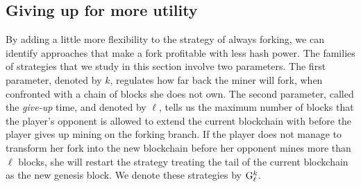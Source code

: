 %

\subsection{Giving up for more utility}
\label{sec-giving-up}


By adding a little more flexibility to the strategy of always forking, we can identify approaches that make a fork profitable with less hash power. The families of strategies that we study in this section involve two parameters. The first parameter, denoted by $k$, regulates how far back the miner will fork, when confronted with a chain of blocks she does not own. The second parameter, called the \textit{give-up} time, and denoted by $\ell$, tells us the maximum number of blocks that the player's opponent is allowed to extend the current blockchain with before the player gives up mining on the forking branch. If the player does not manage to transform her fork into the new blockchain before her opponent mines more than $\ell$ blocks, she will restart the strategy treating the tail of the current blockchain as the new genesis block. We denote these strategies by ${\rm {G}}_\ell^k$. 


